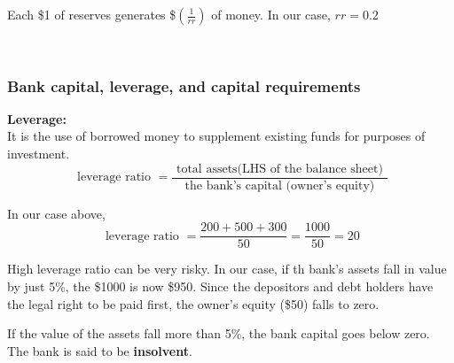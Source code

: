 \documentclass[12pt]{article}
\begin{document}
Each \$1 of reserves generates \$$ (\frac{1}{rr}) $ of money. In our case, $ rr = 0.2 $



\noindent{}\\



\subsubsection{Bank capital, leverage, and capital requirements}



\begin{figure}[H]
\end{figure}

{\textbf {Leverage:}}\\
It is the use of borrowed money to supplement existing funds for purposes of 
investment.
\begin{equation*}
		\text{ leverage ratio } = \frac{\text{ total assets(LHS of the balance sheet) }}
		{\text{ the bank's capital (owner's equity) }}
\end{equation*}

In our case above, 
\begin{equation*}
\text{ leverage ratio } = \frac{200+500+300}{50} = \frac{1000}{50} = 20
\end{equation*}


High leverage ratio can be very risky. In our case, if th bank's assets fall in value
by just 5\%, the \$1000 is now \$950. Since the depositors and debt holders have the
legal right to be paid first, the owner's equity (\$50) falls to zero.

If the value of the assets fall more than 5\%, the bank capital goes below zero.
The bank is said to be {\textbf {insolvent}}.
\end{document}
